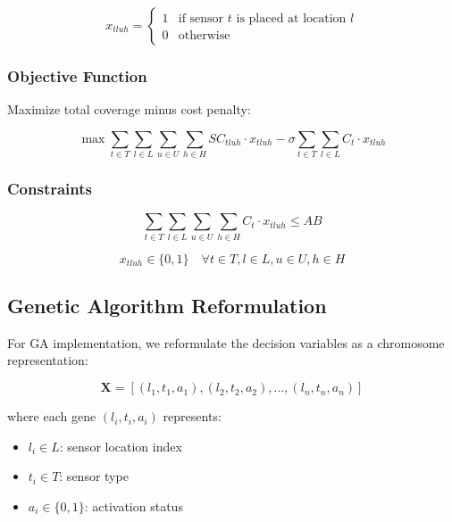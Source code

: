 \begin{equation}
x_{tluh} = \begin{cases}
1 & \text{if sensor } t \text{ is placed at location } l \\
0 & \text{otherwise}
\end{cases}
\end{equation}

\subsubsection{Objective Function}

Maximize total coverage minus cost penalty:

\begin{equation}
\max \sum_{t \in T} \sum_{l \in L} \sum_{u \in U} \sum_{h \in H} SC_{tluh} \cdot x_{tluh} - \sigma \sum_{t \in T} \sum_{l \in L} C_t \cdot x_{tluh}
\label{eq:objective}
\end{equation}

\subsubsection{Constraints}

\begin{equation}
\sum_{t \in T} \sum_{l \in L} \sum_{u \in U} \sum_{h \in H} C_t \cdot x_{tluh} \leq AB
\label{eq:budget}
\end{equation}

\begin{equation}
x_{tluh} \in \{0, 1\} \quad \forall t \in T, l \in L, u \in U, h \in H
\label{eq:binary}
\end{equation}

\subsection{Genetic Algorithm Reformulation}

For GA implementation, we reformulate the decision variables as a chromosome representation:

\begin{equation}
\textbf{X} = [(l_1, t_1, a_1), (l_2, t_2, a_2), ..., (l_n, t_n, a_n)]
\label{eq:chromosome}
\end{equation}

where each gene $(l_i, t_i, a_i)$ represents:
\begin{itemize}
\item $l_i \in L$: sensor location index
\item $t_i \in T$: sensor type
\item $a_i \in \{0, 1\}$: activation status
\end{itemize}

